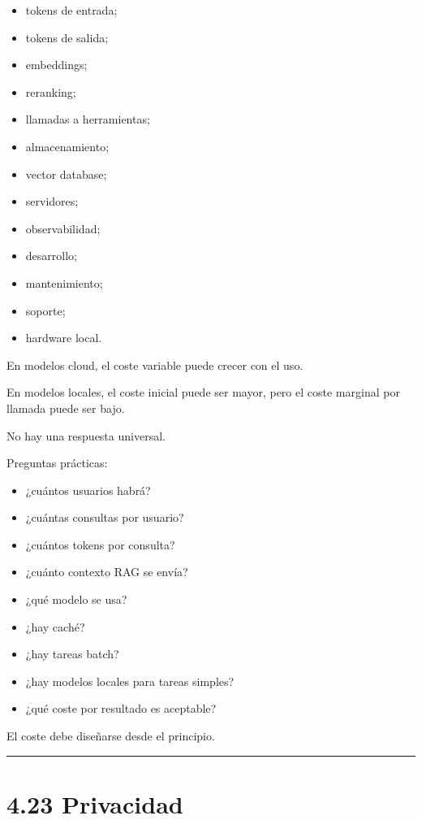 \begin{itemize}
\tightlist
\item
  tokens de entrada;
\item
  tokens de salida;
\item
  embeddings;
\item
  reranking;
\item
  llamadas a herramientas;
\item
  almacenamiento;
\item
  vector database;
\item
  servidores;
\item
  observabilidad;
\item
  desarrollo;
\item
  mantenimiento;
\item
  soporte;
\item
  hardware local.
\end{itemize}

En modelos cloud, el coste variable puede crecer con el uso.

En modelos locales, el coste inicial puede ser mayor, pero el coste
marginal por llamada puede ser bajo.

No hay una respuesta universal.

Preguntas prácticas:

\begin{itemize}
\tightlist
\item
  ¿cuántos usuarios habrá?
\item
  ¿cuántas consultas por usuario?
\item
  ¿cuántos tokens por consulta?
\item
  ¿cuánto contexto RAG se envía?
\item
  ¿qué modelo se usa?
\item
  ¿hay caché?
\item
  ¿hay tareas batch?
\item
  ¿hay modelos locales para tareas simples?
\item
  ¿qué coste por resultado es aceptable?
\end{itemize}

El coste debe diseñarse desde el principio.

\begin{center}\rule{0.5\linewidth}{0.5pt}\end{center}

\section{4.23 Privacidad}\label{privacidad-1}

